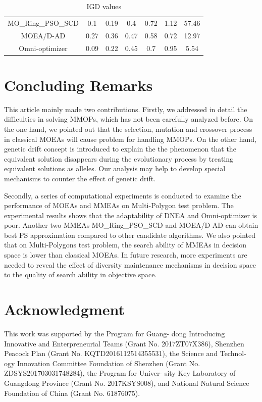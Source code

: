 \documentclass[conference]{IEEEtran}
\begin{document}
\begin{table}[htbp]
\begin{tabular}{@{}ccccccc@{}}
MO\_Ring\_PSO\_SCD & 0.1                          & 0.19                         & 0.4                          & 0.72                         & 1.12                        & 57.46                        \\
MOEA/D-AD       & 0.27                         & 0.36                         & 0.47                         & 0.58                         & 0.72                        & 12.97                        \\
Omni-optimizer  & 0.09                         & 0.22                         & 0.45                         & 0.7                          & 0.95                        & 5.54                         \\ \bottomrule
\end{tabular}
\caption{IGD values}
\label{table: IGD sumup}
\end{table}
\section{Concluding Remarks}
This article mainly made two contributions. Firstly, we addressed in detail the difficulties in solving MMOPs, which has not been carefully analyzed before. On the one hand, we pointed out that the selection, mutation and crossover process in classical MOEAs will cause problem for handling MMOPs. On the other hand, genetic drift concept is introduced to explain the the phenomenon that the equivalent solution disappears during the evolutionary process by treating equivalent solutions as alleles. Our analysis may help to develop special mechanisms to counter the effect of genetic drift. 

Secondly, a series of computational experiments is conducted to examine the performance of MOEAs and MMEAs on Multi-Polygon test problem. The experimental results shows that the adaptability of DNEA and Omni-optimizer is poor. Another two MMEAs MO\_Ring\_PSO\_SCD and MOEA/D-AD can obtain best PS approximation compared to other candidate algorithms. We also pointed that on Multi-Polygons test problem, the search ability of MMEAs in decision space is lower than classical MOEAs. In future research, more experiments are needed to reveal the effect of diversity maintenance mechanisms in decision space to the quality of search ability in objective space.

\section*{Acknowledgment}
This work was supported by the Program for Guang- dong Introducing Innovative and Enterpreneurial Teams (Grant No. 2017ZT07X386), Shenzhen Peacock Plan (Grant No. KQTD2016112514355531), the Science and Technol- ogy Innovation Committee Foundation of Shenzhen (Grant No. ZDSYS201703031748284), the Program for Univer- sity Key Laboratory of Guangdong Province (Grant No. 2017KSYS008), and National Natural Science Foundation of China (Grant No. 61876075).


\end{document}
